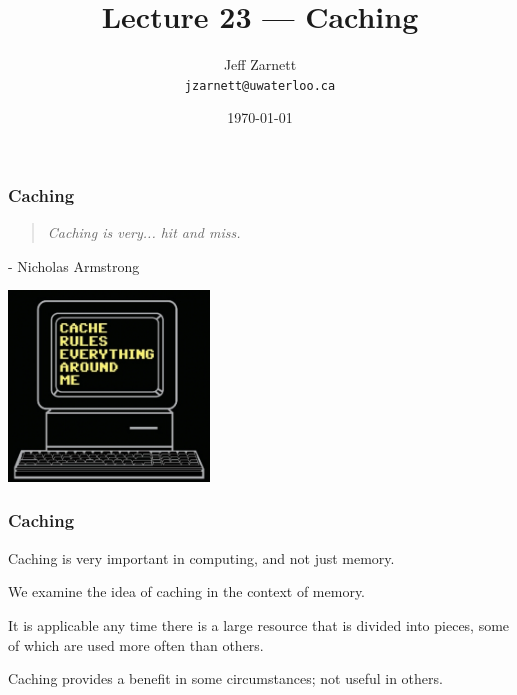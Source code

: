 

\title{Lecture 23 --- Caching }

\author{Jeff Zarnett \\ \small \texttt{jzarnett@uwaterloo.ca}}
\date{\today}




\begin{frame}
  \titlepage

 \end{frame}

\begin{frame}
\frametitle{Caching}

\vspace{5em}

\begin{quote}
\textit{Caching is very... hit and miss.}
\end{quote}
\hfill - Nicholas Armstrong

\begin{center}
	\includegraphics[width=0.4\textwidth]{images/cacherules.jpg}
\end{center}

\end{frame}

\begin{frame}
\frametitle{Caching}

Caching is very important in computing, and not just memory. 

We examine the idea of caching in the context of memory.

It is applicable any time there is a large resource that is divided into pieces, some of which are used more often than others. 

Caching provides a benefit in some circumstances; not useful in others. 


\end{frame}

